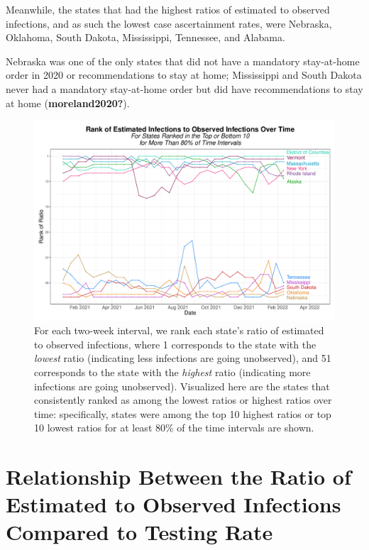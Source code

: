 \documentclass[12pt,twoside]{smiththesis}
\begin{document}
Meanwhile, the states that had the highest ratios of estimated to observed infections, and as such the lowest case ascertainment rates, were Nebraska, Oklahoma, South Dakota, Mississippi, Tennessee, and Alabama.

Nebraska was one of the only states that did not have a mandatory stay-at-home order in 2020 or recommendations to stay at home; Mississippi and South Dakota never had a mandatory stay-at-home order but did have recommendations to stay at home (\textbf{moreland2020?}).
\begin{figure}
\includegraphics[width=1\linewidth]{figure/rank-ratio-over-time} \caption{\label{fig:rank-ratio-over-time}For each two-week interval, we rank each state's ratio of estimated to observed infections, where 1 corresponds to the state with the \emph{lowest} ratio (indicating less infections are going unobserved), and 51 corresponds to the state with the \emph{highest} ratio (indicating more infections are going unobserved). Visualized here are the states that consistently ranked as among the lowest ratios or highest ratios over time: specifically, states were among the top 10 highest ratios or top 10 lowest ratios for at least 80\% of the time intervals are shown.}\label{fig:unnamed-chunk-15}
\end{figure}
\hypertarget{relationship-between-the-ratio-of-estimated-to-observed-infections-compared-to-testing-rate}{%
\section{Relationship Between the Ratio of Estimated to Observed Infections Compared to Testing Rate}\label{relationship-between-the-ratio-of-estimated-to-observed-infections-compared-to-testing-rate}}
\end{document}
